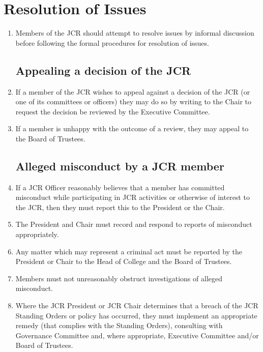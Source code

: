 \documentclass[12pt]{article}
\begin{document}
\section{Resolution of Issues}
\begin{enumerate}
    \item Members of the JCR should attempt to resolve issues by informal discussion before following the formal procedures for resolution of issues.
    \subsection{Appealing a decision of the JCR}
    \item If a member of the JCR wishes to appeal against a decision of the JCR (or one of its committees or officers) they may do so by writing to the Chair to request the decision be reviewed by the Executive Committee.
    \item If a member is unhappy with the outcome of a review, they may appeal to the Board of Trustees.
    \subsection{Alleged misconduct by a JCR member}
    \item If a JCR Officer reasonably believes that a member has committed misconduct while participating in JCR activities or otherwise of interest to the JCR, then they must report this to the President or the Chair.
    \item The President and Chair must record and respond to reports of misconduct appropriately.
    \item Any matter which may represent a criminal act must be reported by the President or Chair to the Head of College and the Board of Trustees.
    \item Members must not unreasonably obstruct investigations of alleged misconduct.
    \item Where the JCR President or JCR Chair determines that a breach of the JCR Standing Orders or policy has occurred, they must implement an appropriate remedy (that complies with the Standing Orders), consulting with Governance Committee and, where appropriate, Executive Committee and/or Board of Trustees.
\end{enumerate}
\end{document}
